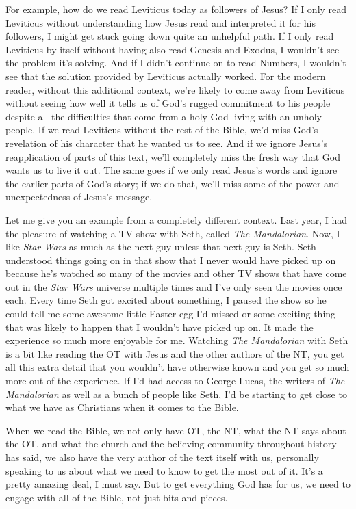 For example, how do we read Leviticus today as followers of Jesus? If I only
read Leviticus without understanding how Jesus read and interpreted it for his
followers, I might get stuck going down quite an unhelpful path. If I only read
Leviticus by itself without having also read Genesis and Exodus, I wouldn't see
the problem it's solving. And if I didn't continue on to read Numbers, I
wouldn't see that the solution provided by Leviticus actually worked. For the
modern reader, without this additional context, we're likely to come away from
Leviticus without seeing how well it tells us of God's rugged commitment to his
people despite all the difficulties that come from a holy God living with an
unholy people. If we read Leviticus without the rest of the Bible, we'd miss
God's revelation of his character that he wanted us to see. And if we ignore
Jesus's reapplication of parts of this text, we'll completely miss the fresh way
that God wants us to live it out. The same goes if we only read Jesus's words
and ignore the earlier parts of God's story; if we do that, we'll miss some of
the power and unexpectedness of Jesus's message.

Let me give you an example from a completely different context. Last year, I had
the pleasure of watching a TV show with Seth, called \textit{The Mandalorian}.
Now, I like \textit{Star Wars} as much as the next guy unless that next guy is
Seth. Seth understood things going on in that show that I never would have
picked up on because he's watched so many of the movies and other TV shows that
have come out in the \textit{Star Wars} universe multiple times and I've only
seen the movies once each. Every time Seth got excited about something, I paused
the show so he could tell me some awesome little Easter egg I'd missed or some
exciting thing that was likely to happen that I wouldn't have picked up on. It
made the experience so much more enjoyable for me. Watching \textit{The
Mandalorian} with Seth is a bit like reading the OT with Jesus and the other
authors of the NT, you get all this extra detail that you wouldn't have
otherwise known and you get so much more out of the experience. If I'd had
access to George Lucas, the writers of \textit{The Mandalorian} as well as a
bunch of people like Seth, I'd be starting to get close to what we have as
Christians when it comes to the Bible.

When we read the Bible, we not only have OT, the NT, what the NT says about the
OT, and what the church and the believing community throughout history has said,
we also have the very author of the text itself with us, personally speaking to
us about what we need to know to get the most out of it. It's a pretty amazing
deal, I must say. But to get everything God has for us, we need to engage with
all of the Bible, not just bits and pieces.

